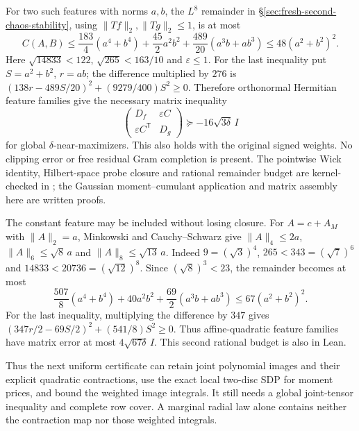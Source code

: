 For two such features with norms $a,b$, the $L^8$ remainder in
\S\ref{sec:fresh-second-chaos-stability}, using $\|Tf\|_2,\|Tg\|_2\le1$,
is at most
\[
 C(A,B)\le\frac{183}{4}(a^4+b^4)+\frac{45}{2}a^2b^2
                   +\frac{489}{20}(a^3b+ab^3)
             \le48(a^2+b^2)^2.
\]
Here $\sqrt{14833}<122$, $\sqrt{265}<163/10$ and $\varepsilon\le1$.
For the last inequality put $S=a^2+b^2$, $r=ab$; the difference multiplied
by $276$ is
$(138r-489S/20)^2+(9279/400)S^2\ge0$.
Therefore orthonormal Hermitian feature families give the necessary matrix
inequality
\begin{equation}\label{eq:shared-quadratic-stability}
 \boxed{\begin{pmatrix}D_f&\varepsilon C\\
                         \varepsilon C^{\mathsf T}&D_g\end{pmatrix}
             \succeq-16\sqrt{3\delta}\,I}
\end{equation}
for global $\delta$-near-maximizers. This also holds with the original signed
weights. No clipping error or free residual Gram completion is present. The
pointwise Wick identity, Hilbert-space probe closure and rational remainder
budget are kernel-checked in ; the Gaussian
moment--cumulant application and matrix assembly here are written proofs.

The constant feature may be included without losing closure. For
$A=c+A_M$ with $\|A\|_2=a$, Minkowski and Cauchy--Schwarz give
$\|A\|_4\le2a$, $\|A\|_6\le\sqrt8\,a$ and
$\|A\|_8\le\sqrt{13}\,a$. Indeed $9=(\sqrt3)^4$,
$265<343=(\sqrt7)^6$ and $14833<20736=(\sqrt{12})^8$.
Since $(\sqrt8)^3<23$, the remainder becomes at most
\[
 \frac{507}{8}(a^4+b^4)+40a^2b^2+
                         \frac{69}{2}(a^3b+ab^3)
                 \le67(a^2+b^2)^2.
\]
For the last inequality, multiplying the difference by $347$ gives
$(347r/2-69S/2)^2+(541/8)S^2\ge0$.
Thus affine-quadratic feature families have matrix error at most
$4\sqrt{67\delta}\,I$. This second rational budget is also in Lean.

Thus the next uniform certificate can retain joint polynomial images and
their explicit quadratic contractions, use the exact local two-disc SDP for
moment prices, and bound the weighted image integrals. It still needs a
global joint-tensor inequality and complete row cover. A marginal radial law
alone contains neither the contraction map nor those weighted integrals.

